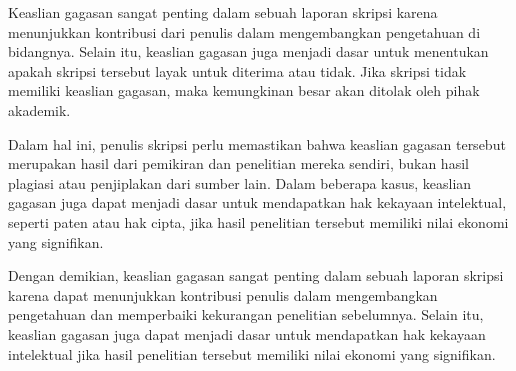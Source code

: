 Keaslian gagasan sangat penting dalam sebuah laporan skripsi karena menunjukkan kontribusi dari penulis dalam mengembangkan pengetahuan di bidangnya. Selain itu, keaslian gagasan juga menjadi dasar untuk menentukan apakah skripsi tersebut layak untuk diterima atau tidak. Jika skripsi tidak memiliki keaslian gagasan, maka kemungkinan besar akan ditolak oleh pihak akademik.

Dalam hal ini, penulis skripsi perlu memastikan bahwa keaslian gagasan tersebut merupakan hasil dari pemikiran dan penelitian mereka sendiri, bukan hasil plagiasi atau penjiplakan dari sumber lain. Dalam beberapa kasus, keaslian gagasan juga dapat menjadi dasar untuk mendapatkan hak kekayaan intelektual, seperti paten atau hak cipta, jika hasil penelitian tersebut memiliki nilai ekonomi yang signifikan.

Dengan demikian, keaslian gagasan sangat penting dalam sebuah laporan skripsi karena dapat menunjukkan kontribusi penulis dalam mengembangkan pengetahuan dan memperbaiki kekurangan penelitian sebelumnya. Selain itu, keaslian gagasan juga dapat menjadi dasar untuk mendapatkan hak kekayaan intelektual jika hasil penelitian tersebut memiliki nilai ekonomi yang signifikan.

